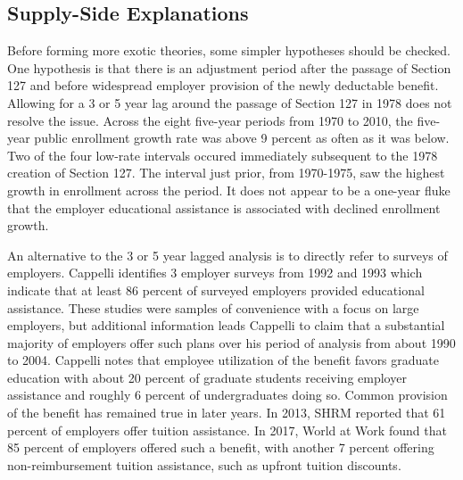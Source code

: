 \documentclass[review]{elsarticle}
\begin{document}
    \subsection{Supply-Side Explanations}
    Before forming more exotic theories, some simpler hypotheses should be checked.
    One hypothesis is that there is an adjustment period after the passage of Section 127 and before widespread employer provision of the newly deductable benefit.
    Allowing for a 3 or 5 year lag around the passage of Section 127 in 1978 does not resolve the issue.
    Across the eight five-year periods from 1970 to 2010, the five-year public enrollment growth rate was above 9 percent as often as it was below.
    Two of the four low-rate intervals occured immediately subsequent to the 1978 creation of Section 127.
    The interval just prior, from 1970-1975, saw the highest growth in enrollment across the period.
    It does not appear to be a one-year fluke that the employer educational assistance is associated with declined enrollment growth.

    An alternative to the 3 or 5 year lagged analysis is to directly refer to surveys of employers.
    Cappelli\cite{cappelli2004employers} identifies 3 employer surveys from 1992 and 1993 which indicate that at least 86 percent of surveyed employers provided educational assistance.
    These studies were samples of convenience with a focus on large employers,
    but additional information leads Cappelli to claim that a substantial majority of employers offer such plans over his period of analysis from about 1990 to 2004.
    Cappelli notes that employee utilization of the benefit favors graduate education
    with about 20 percent of graduate students receiving employer assistance
    and roughly 6 percent of undergraduates doing so.
    Common provision of the benefit has remained true in later years.
    In 2013, SHRM reported that 61 percent of employers offer tuition assistance\cite{cherry2014rejuvenating}.
    In 2017, World at Work found that 85 percent of employers offered such a benefit,
    with another 7 percent offering non-reimbursement tuition assistance, such as upfront tuition discounts\cite{talentculture_2018}.
\end{document}
